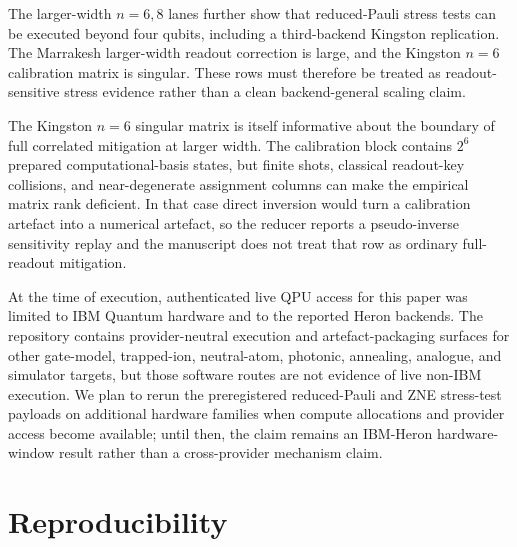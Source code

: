\documentclass[preprint,aps,physrev,superscriptaddress,floatfix,longbibliography]{revtex4-2}
\begin{document}
The larger-width $n=6,8$ lanes further show that reduced-Pauli stress tests can
be executed beyond four qubits, including a third-backend Kingston
replication. The Marrakesh larger-width readout correction is large, and the
Kingston $n=6$ calibration matrix is singular. These rows must therefore be
treated as readout-sensitive stress evidence rather than a clean
backend-general scaling claim.

The Kingston $n=6$ singular matrix is itself informative about the boundary of
full correlated mitigation at larger width. The calibration block contains
$2^6$ prepared computational-basis states, but finite shots, classical
readout-key collisions, and near-degenerate assignment columns can make the
empirical matrix rank deficient. In that case direct inversion would turn a
calibration artefact into a numerical artefact, so the reducer reports a
pseudo-inverse sensitivity replay and the manuscript does not treat that row
as ordinary full-readout mitigation.

At the time of execution, authenticated live QPU access for this paper was
limited to IBM Quantum hardware and to the reported Heron backends. The
repository contains provider-neutral execution and artefact-packaging surfaces
for other gate-model, trapped-ion, neutral-atom, photonic, annealing, analogue,
and simulator targets, but those software routes are not evidence of live
non-IBM execution. We plan to rerun the preregistered reduced-Pauli and ZNE
stress-test payloads on additional hardware families when compute allocations
and provider access become available; until then, the claim remains an
IBM-Heron hardware-window result rather than a cross-provider mechanism claim.

\section{Reproducibility}
\end{document}
